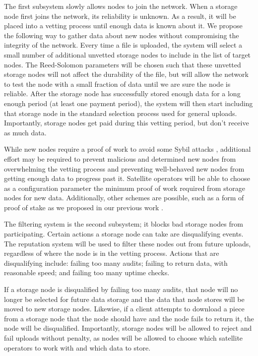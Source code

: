 \documentclass[11pt,fleqn,openany]{book}
\begin{document}
The first subsystem slowly allows nodes to join the network.
When a storage node first joins the network, its reliability is unknown.
As a result, it will be placed into a vetting
process until enough data is known about it.
We propose the following way to gather data about new nodes
without compromising the integrity of the network.
Every time a file is uploaded, the system will select a small number of
additional unvetted storage nodes to include in the list of target nodes.
The Reed-Solomon parameters will be chosen such that these unvetted storage
nodes will not affect the durability of the file, but will allow the network
to test the node
with a small fraction of data until we are sure the node is reliable.
After the storage node has successfully stored enough data for a long enough
period (at least one payment period),
the system will then start including that storage
node in the standard selection process used for general uploads.
Importantly, storage nodes get paid during this
vetting period, but don't receive as much data.

While new nodes require a proof of work to avoid some Sybil attacks
\cite{sybil-attack}, additional effort may be required to prevent
malicious and determined new nodes from overwhelming the vetting process and
preventing well-behaved new nodes from getting enough data to progress past it.
Satellite operators will be able to choose as a configuration
parameter the minimum proof of work required from storage nodes for new data.
Additionally, other schemes are possible, such as a form of proof of stake as
we proposed in our previous work \cite{sybil-cost}.

The filtering system is the second subsystem; it blocks bad storage nodes from
participating.
Certain actions a storage node can take are disqualifying events. The
reputation system will be used to filter these nodes out from future uploads,
regardless of where the node is in the vetting process.
Actions that are disqualifying include: failing too many audits;
failing to return data, with reasonable speed; and failing too many uptime
checks.

If a storage node is disqualified by failing too many audits, that node will no
longer be selected for future data storage and the data that node stores will
be moved to new storage nodes.
Likewise, if a client attempts to download a piece from a storage node that
the node should have and the node fails to return it, the
node will be disqualified. Importantly, storage nodes will be allowed to reject
and fail uploads without penalty, as nodes will be allowed to choose which
satellite operators to work with and which data to store.
\end{document}
